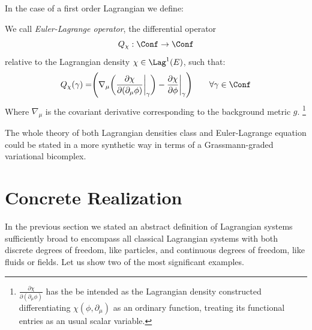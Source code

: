 \documentclass[Main]{subfiles}
\begin{document}
	In the case of a first order Lagrangian we define:
	\begin{definition}
	We call \emph{Euler-Lagrange operator}, the  differential operator
		\begin{displaymath}
			Q_\chi : \Conf \rightarrow \Conf
		\end{displaymath}
		relative to the Lagrangian density $\chi \in \Lag^1(E)$, such that:
		\begin{equation}
			Q_\chi (\gamma) = \Biggr( \nabla_\mu \biggr( \frac{\partial \chi}{\partial(\partial_\mu \phi)} \biggr\vert_\gamma \biggr) - \frac{\partial \chi}{\partial \phi}\biggr\vert_\gamma \Biggr) \qquad \forall \gamma \in \Conf
		\end{equation}
		Where $\nabla_\mu$ is the covariant derivative corresponding to the background metric $g$.
		\footnote{$\frac{\partial \chi}{\partial(\partial_\mu \phi)}$ has the be intended as the Lagrangian density constructed differentiating $\chi(\phi, \partial_\mu)$ as an ordinary function, treating its functional entries as an usual scalar variable.}
	\end{definition}

	\begin{remark}	
		The whole theory of both Lagrangian densities class and Euler-Lagrange equation could be stated in a more synthetic way in terms of a Grassmann-graded variational bicomplex.\cite{Giachetta2009}\cite{Sardanashvily}
	\end{remark}
	
		

	\section{Concrete Realization}
		In the previous section we stated an abstract definition of Lagrangian systems sufficiently broad to encompass all  classical Lagrangian systems with both discrete degrees of freedom, like particles, and continuous degrees of freedom, like fluids or fields.
	Let us show two of the most significant examples.
	
	
	
\end{document}
